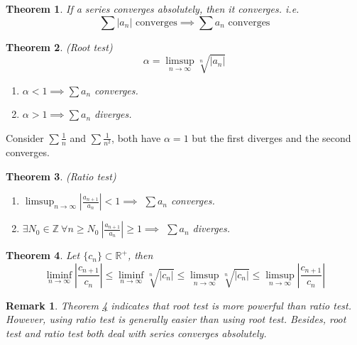 \documentclass[aps,pra,onecolumn,notitlepage,superscriptaddress]{revtex4-1}
\newcommand{\Z}{\mathbb{Z}}
\newcommand{\R}{\mathbb{R}}
\newtheorem{theo}{Theorem}
\newtheorem{rem}{Remark}
\begin{document}
    \begin{theo}
        If a series converges absolutely, then it converges. i.e.
        \begin{equation}
            \sum |a_n| \text{ converges} \implies \sum a_n \text{ converges}
        \end{equation}
    \end{theo}

    \begin{theo}
        (Root test)
        \begin{equation}
            \alpha = \limsup_{n \to \infty} \sqrt[n]{|a_n|}
        \end{equation}
        \begin{enumerate}
            \item $\alpha < 1 \implies \sum a_n$ converges.
            \item $\alpha > 1 \implies \sum a_n$ diverges.
        \end{enumerate}
    \end{theo}

    Consider $\sum \frac{1}{n}$ and $\sum \frac{1}{n^2}$, both have $\alpha=1$ but the first diverges and the second converges.

    \begin{theo} (Ratio test)
        \begin{enumerate}
            \item $\limsup_{n \to \infty} \left| \frac{a_{n+1}}{a_n} \right| < 1 \implies$ $\sum a_n$ converges.
            \item $\exists N_0 \in \Z \ \forall n \geq N_0 \ \left| \frac{a_{n+1}}{a_n} \right| \geq 1 \implies$ $\sum a_n$ diverges.
        \end{enumerate}
    \end{theo}

    \begin{theo} \label{1}
        Let $\{c_n\} \subset \R^+$, then
        \begin{equation}
            \liminf_{n \to \infty} \left|\frac{c_{n+1}}{c_n}\right| \leq \liminf_{n \to \infty} \sqrt[n]{|c_n|} \leq \limsup_{n \to \infty} \sqrt[n]{|c_n|} \leq \limsup_{n \to \infty} \left|\frac{c_{n+1}}{c_n}\right|
        \end{equation}
    \end{theo}

    \begin{rem}
        Theorem \ref{1} indicates that root test is more powerful than ratio test. However, using ratio test is generally easier than using root test. Besides, root test and ratio test both deal with series converges absolutely.
    \end{rem}
\end{document}
